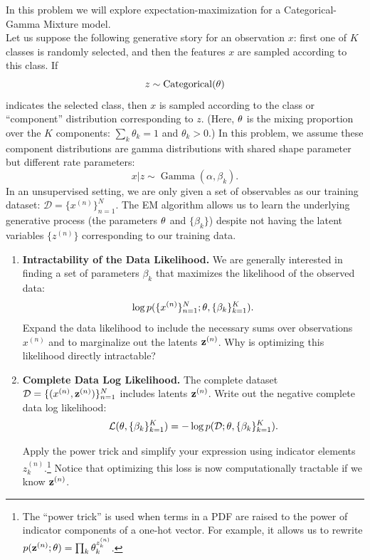 \documentclass[submit]{../harvardml}
\begin{document}
\begin{problem}
  In this problem we will explore expectation-maximization for a Categorical-Gamma Mixture model. \\

  \noindent Let us suppose the following generative story for an observation $x$: first one of $K$ classes is randomly selected, and then the features $x$ are sampled according to this class. If $$z \sim \operatorname{Categorical}(\mathbf{\theta})$$ indicates the selected class, then $x$ is sampled according to the class or ``component'' distribution corresponding to $z$. (Here, $\mathbf{\theta}$ is the mixing proportion over the $K$ components: $\sum_k \theta_k = 1$ and $ \theta_k > 0$.) In this problem, we assume these component distributions are gamma distributions with shared shape parameter but different rate parameters: 
  $$ x | z \sim \operatorname{Gamma}(\alpha, \beta_k). $$
  In an unsupervised setting, we are only given a set of observables as our training dataset: $\mathcal D = \{x^{(n)}\}_{n=1}^N$. The EM algorithm allows us to learn the underlying generative process (the parameters $\mathbf{\theta}$ and $\{\beta_k\}$) despite not having the latent variables $\{z^{(n)}\}$ corresponding to our training data.

  \vspace{1em}

  \begin{enumerate}
    \item \textbf{Intractability of the Data Likelihood.} We are
    generally interested in finding a set of parameters $\beta_k$ that
    maximizes the likelihood of the observed data: $$\log
    p(\{x^{(n)}\}^N_{n=1}; \mathbf{\theta}, \{\beta_k\}^K_{k = 1}).$$ Expand the data
    likelihood to include the necessary sums over observations
    $x^{(n)}$ and to marginalize out the latents
    $\mathbf{z}^{(n)}$. Why is optimizing this likelihood directly
    intractable?

    \item \textbf{Complete Data Log Likelihood.} The complete dataset
    $\mathcal D = \{(x^{(n)}, \mathbf{z}^{(n)})\}_{n=1}^N$ includes latents $\mathbf{z}^{(n)}$. Write
    out the negative complete data log likelihood: $$\mathcal{L}(\mathbf{\theta}, \{\beta_k\}^K_{k=1}) =  -\log p(\mathcal D; \mathbf{\theta}, \{\beta_k\}^K_{k=1}).$$

    Apply the power trick and simplify your expression using indicator elements $z^{(n)}_
    k$.\footnote{The ``power trick'' is used when terms in a PDF are raised to the power of indicator components of a one-hot vector.  For example, it allows us to rewrite $p(\mathbf{z}^{(n)} ;  \mathbf{\theta}) = \prod_k \theta_k^{z^{(n)}_k}$.} Notice that optimizing this loss is now computationally tractable if we know $\mathbf{z}^{(n)}$.


\end{enumerate}
\end{problem}
\end{document}
